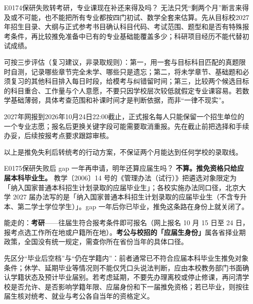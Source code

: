 \begin{qa}{E0174}{保研失败转考研，专业课现在补还来得及吗？}
无法只凭“剩两个月”断言来得及或不可能，也不能把所有专业都按四门初试、数学全套来估算。先从目标校2027年招生目录、大纲与正式参考书目确认科目代码、考试范围、题型和是否有特殊报考条件，再比较推免准备中已有的专业基础能覆盖多少；科研项目经历不能代替初试成绩。

可按三步评估（复习建议，非录取规则）：第一，用一套与目标科目匹配的真题限时自测，记录哪些章节完全未学、哪些只是遗忘；第二，将未学章节、基础题和必须复习的其他科目排入每日时段，给模考与纠错留时间；第三，比较两个候选目标的科目重合、工作量与个人意愿，不要只因学校层次较低就假定专业课容易。若数学基础薄弱，具体考查范围和补课时间才是判断依据，而非“一律不现实”。

2027年网报到2026年10月24日22:00截止，正式报名每人只能保留一个招生单位的一个专业志愿；报名后更换关键字段可能需要取消重报。先在截止前把选择和手续办妥，后续按报考点要求跟踪审核。

以上是推免失利后转统考的行动方案，不保证两个月能达到任何学校的录取线。
\end{qa}

\begin{qa}{E0175}{保研失败后 gap 一年再申请，明年还算应届生吗？}
\textbf{不算。推免资格只给应届本科毕业生。}
教学〔2006〕14 号的《管理办法（试行）》把遴选对象限定为「纳入国家普通本科招生计划录取的应届毕业生」；各校实施办法同口径，北京大学 2027 届办法写的是「纳入国家普通本科招生计划录取的应届毕业生（不含专升本、第二学士学位学生）」。gap 一年后你已毕业，推免这条路在身份上就关闭了。

能走的：\textbf{考研}——往届生符合报考条件即可报名（网上报名 10 月 15 日至 24 日，报考点选工作所在地或户籍所在地）。\textbf{考公与校招的「应届生身份」}属各省择业期政策，全国没有统一规定，需查你所在省份当年的具体口径。

先区分“毕业后空档”与“仍在学籍内”：前者通常已不符合应届本科毕业生推免对象条件；休学、延期毕业等情况则不能仅凭口头说法判断，应由本校教务部门书面确认学籍状态及预计毕业届别。若考虑延期，不要先办理离校或停止修课，再问清学校是否允许、是否影响学籍年限、应届身份和下一届推免资格；若已毕业，则按往届生核对统考、就业与考公各自当年的资格定义。
\end{qa}

